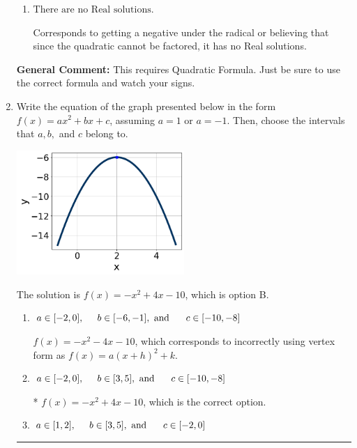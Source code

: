 \documentclass{extbook}[14pt]
\newcommand{\litem}[1]{\item #1

\rule{\textwidth}{0.4pt}}
\begin{document}
\begin{enumerate}
{\begin{enumerate}[label=\Alph*.]
 $x_1 = -19.396 \text{ and } x_2 = 19.796$, which corresponds to writing the Quadratic Formula as $-\frac{b}{2a} \pm \sqrt{b^2 - 4ac}$.
\item \( \text{There are no Real solutions.} \)

Corresponds to getting a negative under the radical or believing that since the quadratic cannot be factored, it has no Real solutions.
\end{enumerate}

\textbf{General Comment:} This requires Quadratic Formula. Just be sure to use the correct formula and watch your signs.
}
\litem{
Write the equation of the graph presented below in the form $f(x)=ax^2+bx+c$, assuming  $a=1$ or $a=-1$. Then, choose the intervals that $a, b,$ and $c$ belong to.

\begin{center}
    \includegraphics[width=0.5\textwidth]{../Figures/quadraticGraphToEquationB.png}
\end{center}




The solution is \( f(x) = -x^{2} +4 x -10 \), which is option B.\begin{enumerate}[label=\Alph*.]
\item \( a \in [-2, 0], \hspace*{5mm} b \in [-6, -1], \text{ and } \hspace*{5mm} c \in [-10, -8] \)

$f(x)=-x^{2} -4 x -10$, which corresponds to incorrectly using vertex form as $f(x) = a(x+h)^2+k$.
\item \( a \in [-2, 0], \hspace*{5mm} b \in [3, 5], \text{ and } \hspace*{5mm} c \in [-10, -8] \)

* $f(x)=-x^{2} +4 x -10$, which is the correct option.
\item \( a \in [1, 2], \hspace*{5mm} b \in [3, 5], \text{ and } \hspace*{5mm} c \in [-2, 0] \)


\end{enumerate}}
\end{enumerate}
\end{document}
